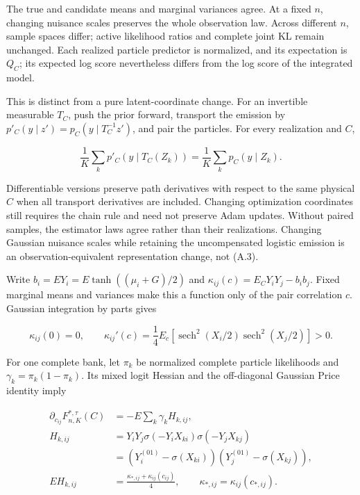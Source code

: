 \documentclass{article}
\begin{document}
The true and candidate means and marginal variances agree. At a fixed
\(n\), changing nuisance scales preserves the whole observation law.
Across different \(n\), sample spaces differ; active likelihood ratios
and complete joint KL remain unchanged. Each realized particle predictor
is normalized, and its expectation is \(Q_C\); its expected log score
nevertheless differs from the log score of the integrated model.

This is distinct from a pure latent-coordinate change. For an invertible
measurable \(T_C\), push the prior forward, transport the emission by
\(p'_C(y\mid z')=p_C(y\mid T_C^{-1}z')\), and pair the particles. For
every realization and \(C\),

\[
\frac1K\sum_kp'_C(y\mid T_C(Z_k))
=\frac1K\sum_kp_C(y\mid Z_k).
\tag{A.3}
\]

Differentiable versions preserve path derivatives with respect to the
same physical \(C\) when all transport derivatives are included.
Changing optimization coordinates still requires the chain rule and need
not preserve Adam updates. Without paired samples, the estimator laws
agree rather than their realizations. Changing Gaussian nuisance scales
while retaining the uncompensated logistic emission is an
observation-equivalent representation change, not (A.3).

Write \(b_i=E Y_i=E\tanh((\mu_i+G)/2)\) and
\(\kappa_{ij}(c)=E_CY_iY_j-b_ib_j\). Fixed marginal means and variances
make this a function only of the pair correlation \(c\). Gaussian
integration by parts gives

\[
\kappa_{ij}(0)=0,\qquad
\kappa_{ij}'(c)=\frac14E_c[
\operatorname{sech}^2(X_i/2)\operatorname{sech}^2(X_j/2)]>0 .
\tag{A.4}
\]


For one complete bank, let \(\pi_k\) be normalized complete particle
likelihoods and \(\gamma_k=\pi_k(1-\pi_k)\). Its mixed logit Hessian and
the off-diagonal Gaussian Price identity imply

\[
\begin{aligned}
\partial_{c_{ij}}F_{n,K}^{*,\tau}(C)
&=-E\sum_k\gamma_kH_{k,ij},\\
H_{k,ij}
&=Y_iY_j\sigma(-Y_iX_{ki})\sigma(-Y_jX_{kj})\\
&=(Y_i^{(01)}-\sigma(X_{ki}))(Y_j^{(01)}-\sigma(X_{kj})),\\
EH_{k,ij}&=\frac{\kappa_{*,ij}+\kappa_{ij}(c_{ij})}{4},
\qquad \kappa_{*,ij}=\kappa_{ij}(c_{*,ij}).
\end{aligned}
\tag{A.5}
\]
\end{document}

